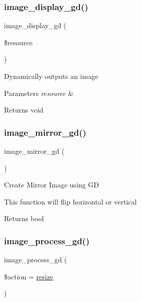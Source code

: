 \subsubsection{\texorpdfstring{image\+\_\+display\+\_\+gd()}{image\_display\_gd()}}
{\footnotesize\ttfamily image\+\_\+display\+\_\+gd (\begin{DoxyParamCaption}\item[{}]{\$resource }\end{DoxyParamCaption})}

Dynamically outputs an image


\begin{DoxyParams}{Parameters}
{\em resource} & \\
\hline
\end{DoxyParams}
\begin{DoxyReturn}{Returns}
void 
\end{DoxyReturn}
\mbox{\label{class_c_i___image__lib_a3f6d47ec077726da699890d4644797ad}} 
\subsubsection{\texorpdfstring{image\+\_\+mirror\+\_\+gd()}{image\_mirror\_gd()}}
{\footnotesize\ttfamily image\+\_\+mirror\+\_\+gd (\begin{DoxyParamCaption}{ }\end{DoxyParamCaption})}

Create Mirror Image using GD

This function will flip horizontal or vertical

\begin{DoxyReturn}{Returns}
bool 
\end{DoxyReturn}
\mbox{\label{class_c_i___image__lib_aa8ef6ef7b931a663dd906ce27236c6fd}} 
\subsubsection{\texorpdfstring{image\+\_\+process\+\_\+gd()}{image\_process\_gd()}}
{\footnotesize\ttfamily image\+\_\+process\+\_\+gd (\begin{DoxyParamCaption}\item[{}]{\$action = {\ttfamily \textquotesingle{}\mbox{\hyperlink{class_c_i___image__lib_a94e38a7d478ce07200a52c51497e598e}{resize}}\textquotesingle{}} }\end{DoxyParamCaption})}

